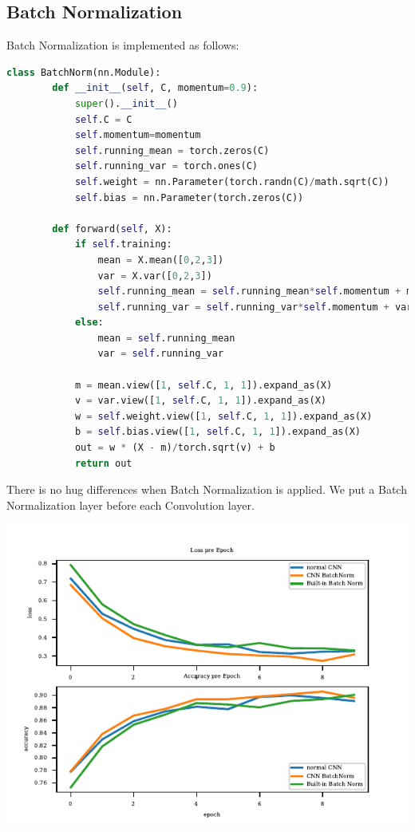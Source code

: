 \documentclass[11pt]{article}
\begin{document}
\subsection{Batch Normalization}

Batch Normalization is implemented as follows:
\begin{lstlisting}[language=python]
class BatchNorm(nn.Module):
        def __init__(self, C, momentum=0.9):
            super().__init__()
            self.C = C
            self.momentum=momentum
            self.running_mean = torch.zeros(C)
            self.running_var = torch.ones(C)
            self.weight = nn.Parameter(torch.randn(C)/math.sqrt(C))
            self.bias = nn.Parameter(torch.zeros(C))

        def forward(self, X):
            if self.training:
                mean = X.mean([0,2,3])
                var = X.var([0,2,3])
                self.running_mean = self.running_mean*self.momentum + mean*(1-self.momentum)
                self.running_var = self.running_var*self.momentum + var*(1-self.momentum)
            else:
                mean = self.running_mean
                var = self.running_var

            m = mean.view([1, self.C, 1, 1]).expand_as(X)
            v = var.view([1, self.C, 1, 1]).expand_as(X)
            w = self.weight.view([1, self.C, 1, 1]).expand_as(X)
            b = self.bias.view([1, self.C, 1, 1]).expand_as(X)
            out = w * (X - m)/torch.sqrt(v) + b
            return out
\end{lstlisting}

There is no hug differences when Batch Normalization is applied. We put a Batch Normalization layer before each Convolution layer.

\includegraphics{figures/2f_dnn.pdf}


\end{document}
